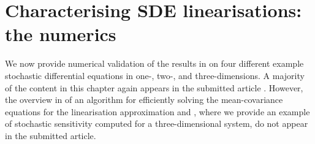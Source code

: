 
\chapter{Characterising SDE linearisations: the numerics}\label{ch:linear_numerics}
We now provide numerical validation of the results in  on four different example stochastic differential equations in one-, two-, and three-dimensions.
A majority of the content in this chapter again appears in the submitted article \citep{BlakeEtAl_2023_ConvergenceStochasticDifferential}.
However, the overview in  of an algorithm \citep{Mazzoni_2008_ComputationalAspectsContinuous} for efficiently solving the mean-covariance equations for the linearisation approximation and , where we provide an example of stochastic sensitivity computed for a three-dimensional system, do not appear in the submitted article.

